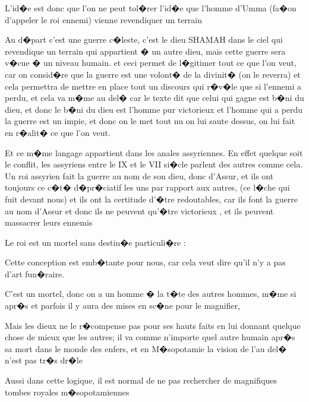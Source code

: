 \documentclass{article}
\begin{document}
\bigskip

L'id�e est donc que l'on ne peut tol�rer l'id�e que l'homme d'Umma (fa�on d'appeler le roi ennemi) vienne revendiquer un terrain 

Au d�part c'est une guerre c�leste, c'est le dieu SHAMAH dans le ciel qui revendique un terrain qui appartient � un autre dieu, mais cette guerre sera v�cue � un niveau humain. et ceci permet de l�gitimer tout ce que l'on veut, car on consid�re que la guerre est une volont� de la divinit� (on le reverra) et cela permettra de mettre en place tout un discours qui r�v�le que si l'ennemi a perdu, et cela va m�me au del� car le texte dit que celui qui gagne est b�ni du dieu, et donc le b�ni du dieu est l'homme pur victorieux et l'homme qui a perdu la guerre est un impie, et donc on le met tout nu on lui saute dessus, on lui fait en r�alit� ce que l'on veut. 

Et ce m�me langage appartient dans les anales assyriennes. En effet quelque soit le conflit, les assyriens entre le IX et le VII si�cle parlent des autres comme cela. Un roi assyrien fait la guerre au nom de son dieu, donc d'Assur, et ils ont toujours ce c�t� d�pr�ciatif les uns par rapport aux autres, (ce l�che qui fuit devant nous) et ils ont la certitude d'�tre redoutables, car ils font la guerre au nom d'Assur et donc ils ne peuvent qu'�tre victorieux , et ils peuvent massacrer leurs ennemis


\bigskip


\bigskip


\bigskip


\bigskip


\bigskip

Le roi est un mortel sans destin�e particuli�re : 


\bigskip

Cette conception est emb�tante pour nous, car cela veut dire qu'il n'y a pas d'art fun�raire.

C'est un mortel, donc on a un homme � la t�te des autres hommes, m�me si apr�s et parfois il y aura des mises en sc�ne pour le magnifier, \ 

Mais les dieux ne le r�compense pas pour ses hauts faits en lui donnant quelque chose de mieux que les autres; il va comme n'importe quel autre humain apr�s sa mort dans le monde des enfers, et en M�sopotamie la vision de l'au del� n'est pas tr�s dr�le


\bigskip

Aussi dans cette logique, il est normal de ne pas rechercher de magnifiques tombes royales m�sopotamiennes
\end{document}
